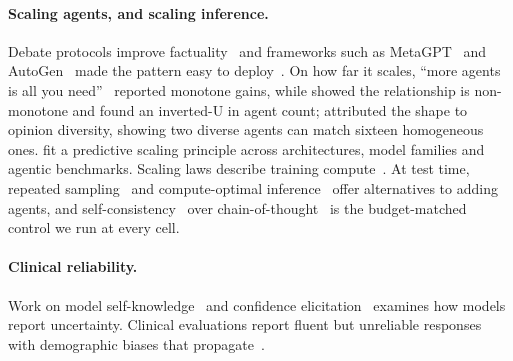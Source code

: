 \paragraph{Scaling agents, and scaling inference.}
Debate protocols improve factuality~\citep{du2024debate, liang2024encouraging} and frameworks such
as MetaGPT~\citep{hong2024metagpt} and AutoGen~\citep{wu2024autogen} made the pattern easy to
deploy~\citep{zhang2024exploring}. On how far it scales, ``more agents is all you
need''~\citep{li2024more} reported monotone gains, while \citet{chen2024morecalls} showed the
relationship is non-monotone and \citet{mas_scaling2606} found an inverted-U in agent count;
\citet{diversity2602} attributed the shape to opinion diversity, showing two diverse agents can
match sixteen homogeneous ones. \citet{kim2026scaling} fit a predictive scaling principle across
architectures, model families and agentic benchmarks. Scaling laws describe training
compute~\citep{kaplan2020scaling, hoffmann2022chinchilla}. At test time, repeated
sampling~\citep{brown2024monkeys} and compute-optimal inference~\citep{snell2024scaling} offer
alternatives to adding agents, and self-consistency~\citep{wang2023selfconsistency} over
chain-of-thought~\citep{wei2022cot} is the budget-matched control we run at every cell.

\paragraph{Clinical reliability.}
Work on model self-knowledge~\citep{kadavath2022know} and confidence
elicitation~\citep{xiong2024can, guo2024calibration} examines how models report uncertainty.
Clinical evaluations report fluent but unreliable responses~\citep{goodman2024accuracy} with
demographic biases that propagate~\citep{omiye2023bias, zack2024bias}.
